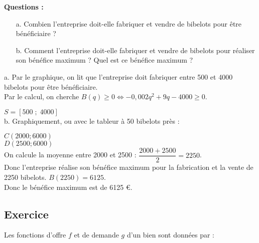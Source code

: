 \newpage

\textbf{Questions :}

\begin{itemize}
\item[a.] Combien l'entreprise doit-elle fabriquer et vendre de bibelots pour être bénéficiaire ? 
\item[b.] Comment l'entreprise doit-elle fabriquer et vendre de bibelots pour réaliser son bénéfice maximum ? Quel est ce bénéfice maximum ?
\end{itemize}

a. Par le graphique, on lit que l'entreprise doit fabriquer entre 500 et 4000 bibelots pour être bénéficiaire. \\

Par le calcul, on cherche $B\left(q\right) \geqslant 0 \Longleftrightarrow -0,002q^2 + 9q -4000 \geqslant 0$. \\


\vspace*{.3cm}

$S = \left[500 \; ; \; 4000 \right]$ \\

b. Graphiquement, ou avec le tableur à 50 bibelots près :

$C\left(2000 ; 6000\right)$ \\
$D\left(2500 ; 6000\right)$ \\

On calcule la moyenne entre 2000 et 2500 : $\dfrac{2000 + 2500}{2} = 2250$. \\

Donc l'entreprise réalise son bénéfice maximum pour la fabrication et la vente de 2250 bibelots. $B\left(2250\right) = 6125$. \\ Donc le bénéfice maximum est de 6125 €.

\newpage

\subsection{Exercice }

Les fonctions d'offre $f$ et de demande $g$ d'un bien sont données par : \\

